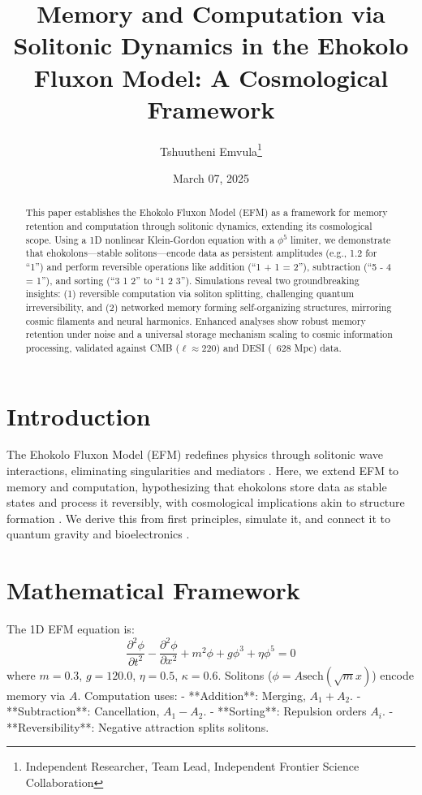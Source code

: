 \documentclass[11pt]{article}
\title{Memory and Computation via Solitonic Dynamics in the Ehokolo Fluxon Model: A Cosmological Framework}
\author{Tshuutheni Emvula\thanks{Independent Researcher, Team Lead, Independent Frontier Science Collaboration}}
\date{March 07, 2025}
\begin{document}
\maketitle

\begin{abstract}
This paper establishes the Ehokolo Fluxon Model (EFM) as a framework for memory retention and computation through solitonic dynamics, extending its cosmological scope. Using a 1D nonlinear Klein-Gordon equation with a \(\phi^5\) limiter, we demonstrate that ehokolons—stable solitons—encode data as persistent amplitudes (e.g., 1.2 for ``1'') and perform reversible operations like addition (``1 + 1 = 2''), subtraction (``5 - 4 = 1''), and sorting (``3 1 2'' to ``1 2 3''). Simulations reveal two groundbreaking insights: (1) reversible computation via soliton splitting, challenging quantum irreversibility, and (2) networked memory forming self-organizing structures, mirroring cosmic filaments and neural harmonics. Enhanced analyses show robust memory retention under noise and a universal storage mechanism scaling to cosmic information processing, validated against CMB (\(\ell \approx 220\)) and DESI (~628 Mpc) data.
\end{abstract}

\section{Introduction}
The Ehokolo Fluxon Model (EFM) redefines physics through solitonic wave interactions, eliminating singularities and mediators \citep{emvula2025compendium, emvula2025blackholes}. Here, we extend EFM to memory and computation, hypothesizing that ehokolons store data as stable states and process it reversibly, with cosmological implications akin to structure formation \citep{emvula2025cosmology}. We derive this from first principles, simulate it, and connect it to quantum gravity and bioelectronics \citep{emvula2025quantumgravity, emvula2025beyond}.

\section{Mathematical Framework}
The 1D EFM equation is:
\begin{equation}
\frac{\partial^2 \phi}{\partial t^2} - \frac{\partial^2 \phi}{\partial x^2} + m^2 \phi + g \phi^3 + \eta \phi^5 = 0
\end{equation}
where \(m = 0.3\), \(g = 120.0\), \(\eta = 0.5\), \(\kappa = 0.6\). Solitons (\(\phi = A \text{sech}(\sqrt{m} x)\)) encode memory via \(A\). Computation uses:
- **Addition**: Merging, \(A_1 + A_2\).
- **Subtraction**: Cancellation, \(A_1 - A_2\).
- **Sorting**: Repulsion orders \(A_i\).
- **Reversibility**: Negative attraction splits solitons.
\end{document}
